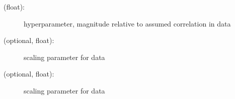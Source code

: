 \documentclass[letterpaper,10pt,english,openany,oneside]{sphinxmanual}
\begin{document}
\begin{fulllineitems}
\begin{description}
\begin{description}
\item[{ (float):}] \leavevmode
hyperparameter, magnitude relative to assumed correlation in  data

\item[{ (optional, float):}] \leavevmode
scaling parameter for  data

\item[{ (optional, float):}] \leavevmode
scaling parameter for  data

\end{description}

\end{description}

\end{fulllineitems}

\end{document}
